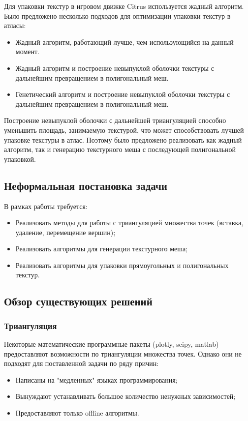 \documentclass{fefu}
\begin{document}
Для упаковки текстур в игровом движке Citrus используется жадный алгоритм. Было предложено несколько подходов для
оптимизации упаковки текстур в атласы:
\begin{itemize}
    \item Жадный алгоритм, работающий лучше, чем использующийся на данный момент.
    \item Жадный алгоритм и построение невыпуклой оболочки текстуры с дальнейшим превращением в полигональный меш.
    \item Генетический алгоритм и построение невыпуклой оболочки текстуры с дальнейшим превращением в полигональный меш.
\end{itemize}

Построение невыпуклой оболочки с дальнейшей триангуляцией способно уменьшить площадь, занимаемую текстурой, что
может способствовать лучшей упаковке текстуры в атлас. Поэтому было предложено реализовать как жадный алгоритм, так и
генерацию текстурного меша с последующей полигональной упаковкой.
\subsection{Неформальная постановка задачи}
В рамках работы требуется:
\begin{itemize}
    \item Реализовать методы для работы с триангуляцией множества точек (вставка, удаление, перемещение вершин);
    \item Реализовать алгоритмы для генерации текстурного меша;
    \item Реализовать алгоритмы для упаковки прямоугольных и полигональных текстур.
\end{itemize}
\subsection{Обзор существующих решений}
\subsubsection{Триангуляция}
Некоторые математические программные пакеты (plotly, scipy, matlab) предоставляют возможности по триангуляции
множества точек. Однако они не подходят для поставленной задачи по ряду причин:
\begin{itemize}
    \item Написаны на "медленных" языках программирования;
    \item Вынуждают устанавливать большое количество ненужных зависимостей;
    \item Предоставляют только offline алгоритмы.
\end{itemize}
\end{document}
